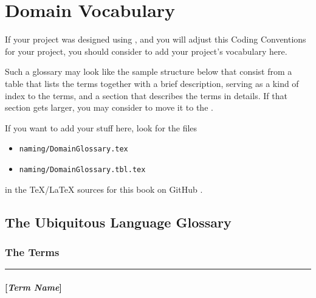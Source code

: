 \section{Domain Vocabulary}\label{sec:DomainVocabulary}
If your project was designed using  \autocite{Evans:DomainDrivenDesign}, and you will adjust this Coding Conventions for your project, you should consider to add your project's vocabulary here.

Such a glossary may look like the sample structure below that consist from a table that lists the terms together with a brief description, serving as a kind of index to the terms, and a section that describes the terms in details. If that section gets larger, you may consider to move it to the .

If you want to add your stuff here, look for the files
\begin{itemize}
\item{\texttt{naming/DomainGlossary.tex}}
\item{\texttt{naming/DomainGlossary.tbl.tex}}
\end{itemize} 
in the \TeX/\LaTeX{} sources for this book on GitHub \autocite{TQUADRAT_ORG_DOCUMENT_REPOSITORY}.


\clearpage
\subsection{The Ubiquitous Language Glossary} 
\renewcommand{\cellalign}{tl}

\subsubsection{The Terms}



\noindent\rule{\textwidth}{0.4pt}

\paragraph{[\textit{Term Name}]}\label{ddterm:TermName}

